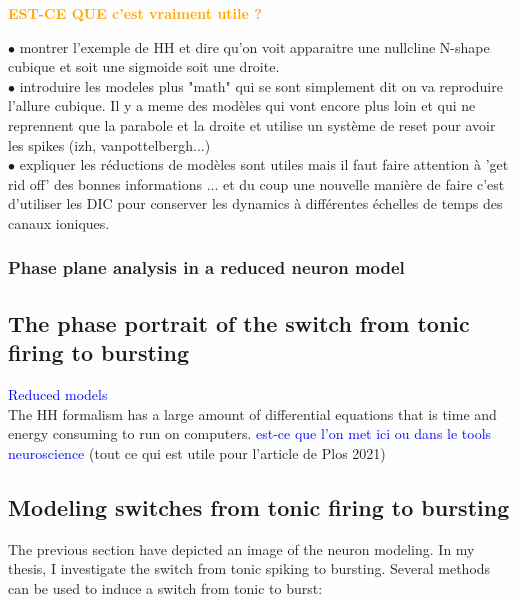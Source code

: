 \textcolor{orange}{\textbf{EST-CE QUE c'est vraiment utile ?} }

$\bullet$ montrer l'exemple de HH et dire qu'on voit apparaitre une nullcline N-shape cubique et soit une sigmoide soit une droite. \\
$\bullet$ introduire les modeles plus "math" qui se sont simplement dit on va reproduire l'allure cubique. Il y a meme des modèles qui vont encore plus loin et qui ne reprennent que la parabole et la droite et utilise un système de reset pour avoir les spikes (izh, vanpottelbergh...) \\
$\bullet$ expliquer les réductions de modèles sont utiles mais il faut faire attention à 'get rid off' des bonnes informations ... et du coup une nouvelle manière de faire c'est d'utiliser les DIC pour conserver les dynamics à différentes échelles de temps des canaux ioniques. \\


\subsubsection{Phase plane analysis in a reduced neuron model}



\subsection{The phase portrait of the switch from tonic firing to bursting}


\textcolor{blue}{Reduced models}\\
The \acrshort{HH} formalism has a large amount of differential equations that is time and energy consuming to run on computers. 
\textcolor{blue}{est-ce que l'on met ici ou dans le tools neuroscience }
(tout ce qui est utile pour l'article de Plos 2021)

\color{black}





\subsection{Modeling switches from tonic firing to bursting}
The previous section have depicted an image of the neuron modeling. In my thesis, I investigate the switch from tonic spiking to bursting. Several methods can be used to induce a switch from tonic to burst:


